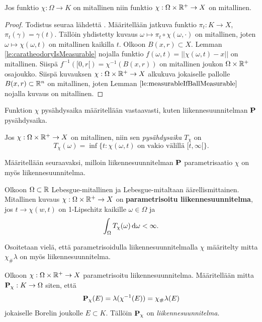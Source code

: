 \documentclass[12pt,oneside,a4paper]{amsbook} %
\begin{document}
\begin{lemma}\label{le:chiMeasurable}
    Jos funktio $ \chi: \Omega \to K$ on mitallinen niin funktio $\chi: \Omega \times \R^+ \to X $ on mitallinen.
\end{lemma}
\begin{proof}
Todistus seuraa lähdettä \cite[s. 27]{optimal}.
Määritellään jatkuva funktio $\pi_t:K \to X$, $\pi_t(\gamma) = \gamma(t)$. Tällöin yhdistetty kuvaus $\omega \mapsto \pi_t \circ \chi (\omega, \cdot)$ on mitallinen, joten $\omega \mapsto \chi(\omega, t)$ on mitallinen kaikilla $t$. Olkoon $B(x, r) \subset X$. Lemman \ref{le:caratheodoryIsMeasurable} nojalla funktio $f(\omega, t) = ||\chi(\omega, t) - x||$ on mitallinen. Siispä $f^{-1}([0,r[) = \chi^{-1}(B(x,r))$ on mitallinen joukon $\Omega \times \Rp$ osajoukko. Siispä kuvauksen $\chi:\Omega \times \Rp \to X $ alkukuva jokaiselle pallolle $B(x, r) \subset \R^n$ on mitallinen, joten Lemman $\ref{le:measurableIfBallMeasurable}$ nojalla kuvaus on mitallinen.
\end{proof}
Funktion $\chi$ pysähdysaika määritellään vastaavasti, kuten liikennesuunnitelman $\P$ pysähdysaika.
\begin{definition}
    Jos $\chi: \Omega \times \R^+ \to X$ on mitallinen, niin sen \textit{pysähdysaika} $T_\chi$ on
    \[T_\chi (\omega) = \inf\{t : \chi(\omega, t) \text{ on vakio välillä } [t,\infty[\}.\]
\end{definition}

Määritellään seuraavaksi, milloin liikennesuunnitelman $\P$ parametrisaatio $\chi$ on myös liikennesuunnitelma.
\begin{definition} \label{def:parameterizedTP}
    Olkoon $\Omega \subset \R$ Lebesgue-mitallinen ja Lebesgue-mitaltaan äärellismittainen. Mitallinen kuvaus $\chi: \Omega \times \R^+ \to X$ on \textbf{parametrisoitu liikennesuunnitelma}, jos $t\to \chi(w,t)$ on 1-Lipschitz kaikille $\omega \in \Omega$ ja
    \[\int_\Omega T_\chi (\omega) \, \d \omega < \infty .\]
\end{definition}


Osoitetaan vielä, että parametrisoidulla liikennesuunnitelmalla $\chi$ määritelty mitta $\chi_\#\lambda$ on myös liikennesuunnitelma.

\begin{theorem}
    Olkoon $\chi : \Omega \times \R^+ \to X$ parametrisoitu liikennesuunnitelma.
    Määritellään mitta $\P_\chi : K \to \Omega$ siten, että \[\P_\chi (E) = \lambda(\chi^{-1}(E)) = \chi_\#\lambda(E)\] jokaiselle Borelin joukolle $E\subset K$. 
    Tällöin $\P_\chi$ on \textit{liikennesuunnitelma}. 
\end{theorem}
\end{document}
